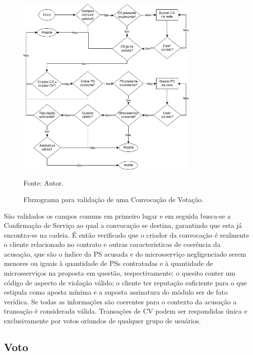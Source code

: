\begin{figure}[ht!]
\caption{Fluxograma para validação de uma Convocação de Votação.}
\centering
\includegraphics[width=0.8\textwidth]{imagens/validacao_cv.png}
\begin{center}
        Fonte: Autor.
\end{center}
\label{fig:validacao_cv}
\end{figure}

São validados os campos comuns em primeiro lugar e em seguida busca-se a Confirmação de Serviço ao qual a convocação se destina, garantindo que esta já encontra-se na cadeia. É então verificado que o criador da convocação é realmente o cliente relacionado no contrato e outras características de coerência da acusação, que são o índice da \ac{PS} acusada  e do microsserviço negligenciado serem menores ou iguais à quantidade de \acp{PS} contratadas e à quantidade de microsserviços na proposta em questão, respectivamente; o quesito conter um código de aspecto de violação válido; o cliente ter reputação suficiente para o que estipula como aposta mínima e a suposta assinatura do módulo ser de fato verídica. Se todas as informações são coerentes para o contexto da acusação a transação é considerada válida.
%
Transações de \ac{CV} podem ser respondidas única e exclusivamente por votos oriundos de qualquer grupo de usuários.

\subsection{Voto}
\label{sec:proposta:auditoria:voto}

